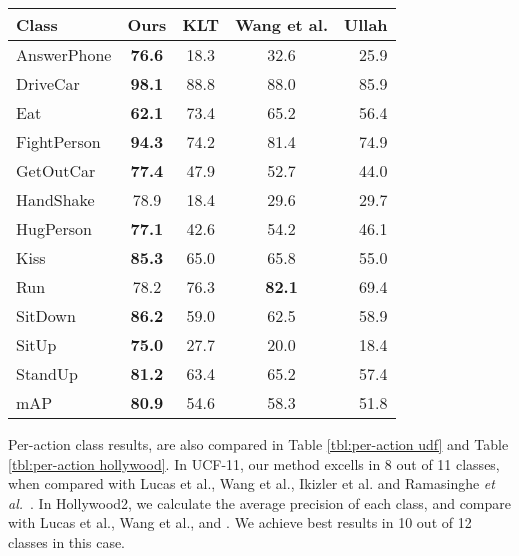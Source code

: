\begin{table*}[]
\centering
\caption{Per-class mAP comparison with state-of-the-art on Hollywood2 (average precision values).}\label{tbl:per-action hollywood}
\begin{tabular}{@{} l c c c r}
\toprule
Class            & Ours           & KLT\cite{lucas1981iterative} & Wang et al.\cite{wang2011action} & Ullah\cite{ullah2010improving}   \\ \midrule \midrule
AnswerPhone      & \textbf{76.6}& 18.3    & 32.6    & 25.9        \\
DriveCar         & \textbf{98.1}& 88.8    & 88.0    & 85.9     \\
Eat              & \textbf{62.1}& 73.4    & 65.2    & 56.4         \\
FightPerson      & \textbf{94.3}& 74.2    & 81.4    & 74.9         \\
GetOutCar        & \textbf{77.4}& 47.9    & 52.7    & 44.0       \\
HandShake        & 78.9         & 18.4   & 29.6    & 29.7         \\
HugPerson        & \textbf{77.1}& 42.6    & 54.2    & 46.1         \\
Kiss             & \textbf{85.3}         & 65.0    & 65.8    & 55.0         \\
Run              & 78.2         & 76.3    & \textbf{82.1}    & 69.4         \\
SitDown          & \textbf{86.2}         & 59.0    & 62.5    & 58.9         \\
SitUp            & \textbf{75.0}         & 27.7    & 20.0    & 18.4         \\
StandUp          & \textbf{81.2}         & 63.4    & 65.2    & 57.4         \\ \midrule
mAP              &     \textbf{80.9}           &   54.6         &     58.3       &     51.8      \\ \bottomrule
\end{tabular}
\end{table*}




Per-action class results, are also compared in Table \ref{tbl:per-action udf} and Table \ref{tbl:per-action hollywood}. In UCF-11, our method excells
in 8 out of 11 classes, when compared with Lucas et al.\cite{lucas1981iterative}, Wang et al.\cite{wang2011action}, Ikizler et al.\cite{ikizler2010object}
and Ramasinghe \emph{et al.}~\cite{7486474}. In Hollywood2,
we calculate the average precision of each class, and compare with Lucas et al.\cite{lucas1981iterative}, Wang et al.\cite{wang2011action}, and \cite{ullah2010improving}.
We achieve best results in 10 out of 12 classes in this case.






